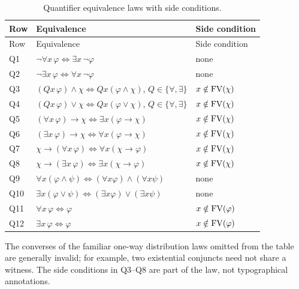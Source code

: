 \begingroup\small\setlength{\tabcolsep}{4pt}
\begin{longtable}{@{}p{.32in}p{2.55in}p{1.88in}@{}}
\caption{Quantifier equivalence laws with side conditions.}
\label{tab:p02-quantifier-equivalences}\\
\toprule
Row & Equivalence & Side condition \\ \midrule
\endfirsthead
\toprule Row & Equivalence & Side condition \\ \midrule
\endhead
Q1 & \(\neg\forall x\,\varphi\Leftrightarrow
       \exists x\,\neg\varphi\) & none \\
Q2 & \(\neg\exists x\,\varphi\Leftrightarrow
       \forall x\,\neg\varphi\) & none \\
Q3 & \((Qx\,\varphi)\land\chi\Leftrightarrow
       Qx(\varphi\land\chi)\), \(Q\in\{\forall,\exists\}\) &
       \(x\notin\operatorname{FV}(\chi)\) \\
Q4 & \((Qx\,\varphi)\lor\chi\Leftrightarrow
       Qx(\varphi\lor\chi)\), \(Q\in\{\forall,\exists\}\) &
       \(x\notin\operatorname{FV}(\chi)\) \\
Q5 & \((\forall x\,\varphi)\to\chi\Leftrightarrow
       \exists x(\varphi\to\chi)\) & \(x\notin\operatorname{FV}(\chi)\) \\
Q6 & \((\exists x\,\varphi)\to\chi\Leftrightarrow
       \forall x(\varphi\to\chi)\) & \(x\notin\operatorname{FV}(\chi)\) \\
Q7 & \(\chi\to(\forall x\,\varphi)\Leftrightarrow
       \forall x(\chi\to\varphi)\) & \(x\notin\operatorname{FV}(\chi)\) \\
Q8 & \(\chi\to(\exists x\,\varphi)\Leftrightarrow
       \exists x(\chi\to\varphi)\) & \(x\notin\operatorname{FV}(\chi)\) \\
Q9 & \(\forall x(\varphi\land\psi)\Leftrightarrow
       (\forall x\varphi)\land(\forall x\psi)\) & none \\
Q10 & \(\exists x(\varphi\lor\psi)\Leftrightarrow
         (\exists x\varphi)\lor(\exists x\psi)\) & none \\
Q11 & \(\forall x\,\varphi\Leftrightarrow\varphi\) &
        \(x\notin\operatorname{FV}(\varphi)\) \\
Q12 & \(\exists x\,\varphi\Leftrightarrow\varphi\) &
        \(x\notin\operatorname{FV}(\varphi)\) \\
\bottomrule
\end{longtable}
\endgroup

The converses of the familiar one-way distribution laws omitted from the
table are generally invalid; for example, two existential conjuncts need not
share a witness.  The side conditions in Q3--Q8 are part of the law, not
typographical annotations.


